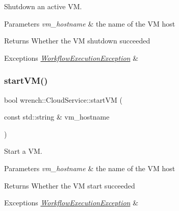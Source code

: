 Shutdown an active VM. 


\begin{DoxyParams}{Parameters}
{\em vm\+\_\+hostname} & the name of the VM host\\
\hline
\end{DoxyParams}
\begin{DoxyReturn}{Returns}
Whether the VM shutdown succeeded
\end{DoxyReturn}

\begin{DoxyExceptions}{Exceptions}
{\em \hyperlink{classwrench_1_1_workflow_execution_exception}{Workflow\+Execution\+Exception}} & \\
\hline
\end{DoxyExceptions}
\mbox{\label{classwrench_1_1_cloud_service_a1a074e4259a9f1e786dab385ccf39e62}} 
\subsubsection{\texorpdfstring{start\+V\+M()}{startVM()}}
{\footnotesize\ttfamily bool wrench\+::\+Cloud\+Service\+::start\+VM (\begin{DoxyParamCaption}\item[{const std\+::string \&}]{vm\+\_\+hostname }\end{DoxyParamCaption})\hspace{0.3cm}{\ttfamily [virtual]}}



Start a VM. 


\begin{DoxyParams}{Parameters}
{\em vm\+\_\+hostname} & the name of the VM host\\
\hline
\end{DoxyParams}
\begin{DoxyReturn}{Returns}
Whether the VM start succeeded
\end{DoxyReturn}

\begin{DoxyExceptions}{Exceptions}
{\em \hyperlink{classwrench_1_1_workflow_execution_exception}{Workflow\+Execution\+Exception}} & \\
\hline
\end{DoxyExceptions}
\mbox{\label{classwrench_1_1_cloud_service_a8607984fbc7a852319045e2248b7a6d9}} 
